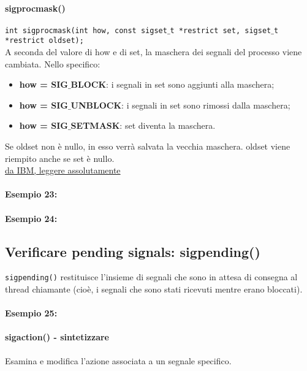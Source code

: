 \paragraph{sigprocmask()}
\texttt{int sigprocmask(int how, const sigset$\_$t *restrict set, sigset$\_$t *restrict oldset);}\\
A seconda del valore di how e di set, la maschera dei segnali del processo viene cambiata. Nello specifico:
\begin{itemize}
    \item \textbf{how = SIG$\_$BLOCK}: i segnali in set sono aggiunti alla maschera;
    \item \textbf{how = SIG$\_$UNBLOCK}: i segnali in set sono rimossi dalla maschera;
    \item \textbf{how = SIG$\_$SETMASK}: set diventa la maschera.
\end{itemize}
Se oldset non è nullo, in esso verrà salvata la vecchia maschera. oldset viene riempito anche se set è nullo.\\
\href{https://www.ibm.com/docs/en/ztpf/1.1.0.15?topic=apis-sigprocmaskexamine-change-blocked-signals}{da IBM, leggere assolutamente}\\
\paragraph{Esempio 23:}\hfill \break


\paragraph{Esempio 24:}\hfill \break


\subsection{Verificare pending signals: sigpending()}
\texttt{sigpending()} restituisce l'insieme di segnali che sono in attesa di consegna al thread chiamante (cioè, i segnali che sono stati ricevuti mentre erano bloccati).\\
\paragraph{Esempio 25:}\hfill \break


\paragraph{sigaction() - sintetizzare}
Esamina e modifica l'azione associata a un segnale specifico.

